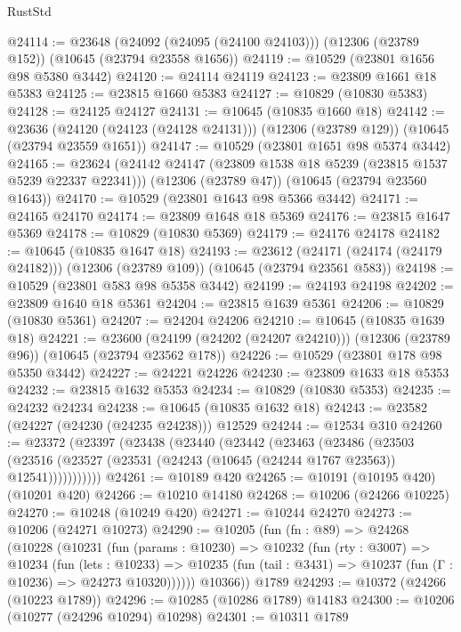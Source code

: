 \begin{lexlean}{RustStd}
\begin{coremodule}
@24114 := @23648
    (@24092 (@24095 (@24100 @24103)))
    (@12306 (@23789 @152))
    (@10645 (@23794 @23558 @1656))
@24119 := @10529 (@23801 @1656 @98 @5380 @3442)
@24120 := @24114 @24119
@24123 := @23809 @1661 @18 @5383
@24125 := @23815 @1660 @5383
@24127 := @10829 (@10830 @5383)
@24128 := @24125 @24127
@24131 := @10645 (@10835 @1660 @18)
@24142 := @23636
    (@24120 (@24123 (@24128 @24131)))
    (@12306 (@23789 @129))
    (@10645 (@23794 @23559 @1651))
@24147 := @10529 (@23801 @1651 @98 @5374 @3442)
@24165 := @23624
    (@24142 @24147 (@23809 @1538 @18 @5239 (@23815 @1537 @5239 @22337 @22341)))
    (@12306 (@23789 @47))
    (@10645 (@23794 @23560 @1643))
@24170 := @10529 (@23801 @1643 @98 @5366 @3442)
@24171 := @24165 @24170
@24174 := @23809 @1648 @18 @5369
@24176 := @23815 @1647 @5369
@24178 := @10829 (@10830 @5369)
@24179 := @24176 @24178
@24182 := @10645 (@10835 @1647 @18)
@24193 := @23612
    (@24171 (@24174 (@24179 @24182)))
    (@12306 (@23789 @109))
    (@10645 (@23794 @23561 @583))
@24198 := @10529 (@23801 @583 @98 @5358 @3442)
@24199 := @24193 @24198
@24202 := @23809 @1640 @18 @5361
@24204 := @23815 @1639 @5361
@24206 := @10829 (@10830 @5361)
@24207 := @24204 @24206
@24210 := @10645 (@10835 @1639 @18)
@24221 := @23600
    (@24199 (@24202 (@24207 @24210)))
    (@12306 (@23789 @96))
    (@10645 (@23794 @23562 @178))
@24226 := @10529 (@23801 @178 @98 @5350 @3442)
@24227 := @24221 @24226
@24230 := @23809 @1633 @18 @5353
@24232 := @23815 @1632 @5353
@24234 := @10829 (@10830 @5353)
@24235 := @24232 @24234
@24238 := @10645 (@10835 @1632 @18)
@24243 := @23582 (@24227 (@24230 (@24235 @24238))) @12529
@24244 := @12534 @310
@24260 := @23372
    (@23397
      (@23438
        (@23440
          (@23442
            (@23463
              (@23486
                (@23503
                  (@23516 (@23527 (@23531 (@24243 (@10645 (@24244 @1767 @23563)) @12541)))))))))))
@24261 := @10189 @420
@24265 := @10191 (@10195 @420) (@10201 @420)
@24266 := @10210 @14180
@24268 := @10206 (@24266 @10225)
@24270 := @10248 (@10249 @420)
@24271 := @10244 @24270
@24273 := @10206 (@24271 @10273)
@24290 := @10205
    (fun (fn : @89) =>
    @24268
      (@10228
        (@10231
          (fun (params : @10230) =>
          @10232
            (fun (rty : @3007) =>
            @10234
              (fun (lets : @10233) =>
              @10235 (fun (tail : @3431) => @10237 (fun (Γ : @10236) => @24273 @10320))))))
        @10366))
    @1789
@24293 := @10372 (@24266 (@10223 @1789))
@24296 := @10285 (@10286 @1789) @14183
@24300 := @10206 (@10277 (@24296 @10294) @10298)
@24301 := @10311 @1789

\end{coremodule}
\end{lexlean}
